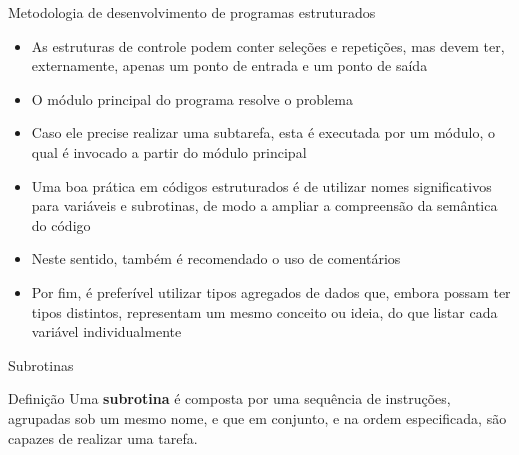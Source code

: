 \begin{frame}[fragile]{Metodologia de desenvolvimento de programas estruturados}

    \begin{itemize}
        \item As estruturas de controle podem conter seleções e repetições, mas devem ter, 
            externamente, apenas um ponto de entrada e um ponto de saída

        \item O módulo principal do programa resolve o problema

        \item Caso ele precise realizar uma subtarefa, esta é executada por um módulo, o qual é
            invocado a partir do módulo principal

        \item Uma boa prática em códigos estruturados é de utilizar nomes significativos para
            variáveis e subrotinas, de modo a ampliar a compreensão da semântica do código

        \item Neste sentido, também é recomendado o uso de comentários

        \item Por fim, é preferível utilizar tipos agregados de dados que, embora possam ter
            tipos distintos, representam um mesmo conceito ou ideia, do que listar cada variável
            individualmente
    \end{itemize}

\end{frame}

\begin{frame}[fragile]{Subrotinas}

    \begin{block}{Definição}
        Uma \textbf{subrotina} é composta por uma sequência de instruções, agrupadas sob um mesmo
            nome, e que em conjunto, e na ordem especificada, são capazes de realizar uma tarefa.
    \end{block}

\end{frame}

